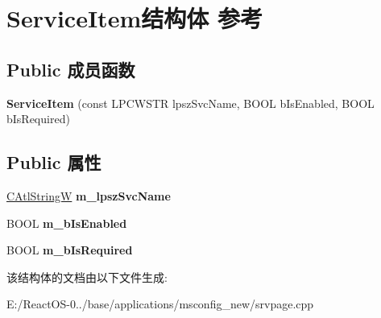 \hypertarget{struct_service_item}{}\section{Service\+Item结构体 参考}
\label{struct_service_item}
\subsection*{Public 成员函数}
\begin{DoxyCompactItemize}
\item 
\mbox{\label{struct_service_item_a2ef2cbb2a45db1f2a5cbeec0e9272e23}} 
{\bfseries Service\+Item} (const L\+P\+C\+W\+S\+TR lpsz\+Svc\+Name, B\+O\+OL b\+Is\+Enabled, B\+O\+OL b\+Is\+Required)
\end{DoxyCompactItemize}
\subsection*{Public 属性}
\begin{DoxyCompactItemize}
\item 
\mbox{\label{struct_service_item_ac6d09ea0dd47118ca35325e1b2f2ddaf}} 
\hyperlink{class_a_t_l_1_1_c_string_t}{C\+Atl\+StringW} {\bfseries m\+\_\+lpsz\+Svc\+Name}
\item 
\mbox{\label{struct_service_item_a21c9c40c07d86e8dfd4b8704f98015e3}} 
B\+O\+OL {\bfseries m\+\_\+b\+Is\+Enabled}
\item 
\mbox{\label{struct_service_item_a484eae91fb94793c9b21cce0242783ac}} 
B\+O\+OL {\bfseries m\+\_\+b\+Is\+Required}
\end{DoxyCompactItemize}


该结构体的文档由以下文件生成\+:\begin{DoxyCompactItemize}
\item 
E\+:/\+React\+O\+S-\/0../base/applications/msconfig\+\_\+new/srvpage.\+cpp\end{DoxyCompactItemize}
